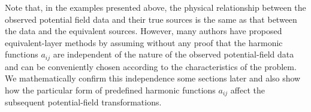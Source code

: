 Note that, in the examples presented above, the physical relationship 
between the observed potential field data and their true sources is the
same as that between the data and the equivalent sources.
However, many authors 
\cite[e.g.,][]{cordell1992, guspi_novara2009, li_etal2014, soler_uieda2021} 
have proposed equivalent-layer methods by assuming without any proof that the harmonic functions $a_{ij}$ are 
independent of the nature of the observed potential-field data and can be 
conveniently chosen according to the characteristics of the problem.
We mathematically confirm this independence some sections later and also show how 
the particular form of predefined harmonic functions $a_{ij}$ affect the subsequent 
potential-field transformations.
